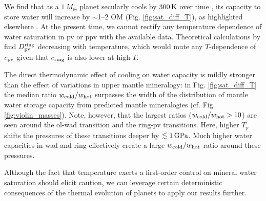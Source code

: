We find that as a $1\,M_\oplus$ planet secularly cools by $300\,{\rm K}$ over time \citep[an amount by which Earth's own mantle may have cooled over its history;][]{HERZBERG2010}, its capacity to store water will increase by $\sim$1--2 OM (Fig. \ref{fig:sat_diff_T}), as highlighted elsewhere \citep{shah_internal_2021, dong_constraining_2021, andrault_mantle_2022}. At the present time, we cannot rectify any temperature dependence of water saturation in pv or ppv with the available data. Theoretical calculations by \citet{hernandez_incorporation_2013} find $D^{\rm ring}_{\rm pv}$ decreasing with temperature, which would mute any $T$-dependence of $c_{\rm pv}$ given that $c_{\rm ring}$ is also lower at high $T$.

The direct thermodynamic effect of cooling on water capacity is mildly stronger than the effect of variations in upper mantle mineralogy: in Fig. \ref{fig:sat_diff_T} the median ratio $w_{\rm cold}/w_{\rm hot}$ surpasses the width of the distribution of mantle water storage capacity from predicted mantle mineralogies (cf. Fig. \ref{fig:violin_masses}). Note, however, that the largest ratios ($w_{\rm cold}/w_{\rm hot}>10$) are seen around the ol-wad transition and the ring-pv transitions. Here, higher $T_p$ shifts the pressures of these transitions deeper by $\lesssim1\,{\rm GPa}$. Much higher water capacities in wad and ring effectively create a large $w_{\rm cold}/w_{\rm hot}$ ratio around these pressures.
\medskip





Although the fact that temperature exerts a first-order control on mineral water saturation should elicit caution, we can leverage certain deterministic consequences of the thermal evolution of planets to apply our results further.




